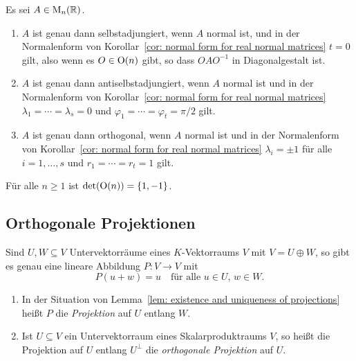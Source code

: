 \begin{corollary}
  Es sei $A \in \mathrm{M}_n(\mathbb{R})$.
  \begin{enumerate}[leftmargin=*, label=\roman*)]
    \item
      $A$ ist genau dann selbstadjungiert, wenn $A$ normal ist, und in der Normalenform von Korollar~\ref{cor: normal form for real normal matrices} $t = 0$ gilt, also wenn es $O \in \mathrm{O}(n)$ gibt, so dass $O A O^{-1}$ in Diagonalgestalt ist.
    \item
      $A$ ist genau dann antiselbstadjungiert, wenn $A$ normal ist und in der Normalenform von Korollar~\ref{cor: normal form for real normal matrices} $\lambda_1 = \dotsb = \lambda_s = 0$ und $\varphi_1 = \dotsb = \varphi_t = \pi/2$ gilt.
    \item
      $A$ ist genau dann orthogonal, wenn $A$ normal ist und in der Normalenform von Korollar~\ref{cor: normal form for real normal matrices} $\lambda_i = \pm 1$ für alle $i = 1, \dotsc, s$ und $r_1 = \dotsb = r_t = 1$ gilt.
  \end{enumerate}
\end{corollary}


\begin{corollary}
  Für alle $n \geq 1$ ist $\det(\mathrm{O}(n)) = \{1,-1\}$.
\end{corollary}










\subsection{Orthogonale Projektionen}


\begin{lemma}\label{lem: existence and uniqueness of projections}
  Sind $U, W \subseteq V$ Untervektorräume eines $K$-Vektorraums $V$ mit $V = U \oplus W$, so gibt es genau eine lineare Abbildung $P \colon V \to V$ mit
  \[
    P(u + w) = u
    \quad
    \text{für alle $u \in U$, $w \in W$}.
  \]
\end{lemma}


\begin{definition}
  \begin{enumerate}[leftmargin=*, label=\roman*)]
    \item
      In der Situation von Lemma~\ref{lem: existence and uniqueness of projections} heißt $P$ die \emph{Projektion} auf $U$ entlang $W$.
    \item
      Ist $U \subseteq V$ ein Untervektorraum eines Skalarproduktraums $V$, so heißt die Projektion auf $U$ entlang $U^\perp$ die \emph{orthogonale Projektion} auf $U$.
  \end{enumerate}
\end{definition}


